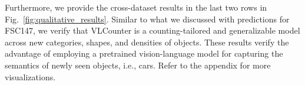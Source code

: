 Furthermore, we provide the cross-dataset results in the last two rows in Fig.~\ref{fig:qualitative_results}.
Similar to what we discussed with predictions for FSC147, we verify that VLCounter is a counting-tailored and generalizable model across new categories, shapes, and densities of objects.
These results verify the advantage of employing a pretrained vision-language model for capturing the semantics of newly seen objects, i.e., cars.
Refer to the appendix for more visualizations.

